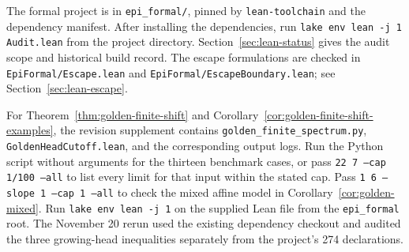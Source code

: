 \documentclass[11pt]{amsart}
\theoremstyle{definition}
\theoremstyle{remark}
\numberwithin{equation}{section}
\begin{document}
The formal project is in \texttt{epi\_formal/}, pinned by
\texttt{lean-toolchain} and the dependency manifest. After installing the
dependencies, run \texttt{lake env lean -j 1 Audit.lean} from the project
directory. Section~\ref{sec:lean-status} gives the audit scope and
historical build record. The escape formulations are checked in
\texttt{EpiFormal/\allowbreak Escape.lean} and
\texttt{EpiFormal/\allowbreak EscapeBoundary.lean}; see
Section~\ref{sec:lean-escape}.

For Theorem~\ref{thm:golden-finite-shift} and Corollary~\ref{cor:golden-finite-shift-examples}, the revision supplement contains
\texttt{golden\_\allowbreak{}finite\_\allowbreak{}spectrum.py},
\texttt{GoldenHeadCutoff.lean}, and the corresponding output logs.
Run the Python script without arguments for the thirteen benchmark cases,
or pass \texttt{22 7 --cap 1/100 --all} to list every limit for that input
within the stated cap. Pass \texttt{1 6 --slope 1 --cap 1 --all}
to check the mixed affine model in Corollary~\ref{cor:golden-mixed}. Run
\texttt{lake env lean -j 1} on the supplied Lean file from the
\texttt{epi\_formal} root. The November 20 rerun used the existing
dependency checkout and audited the three growing-head inequalities
separately from the project's 274 declarations.
\end{document}
